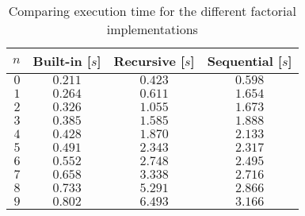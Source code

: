 \begin{table}[ht]
	\begin{center}
	\caption{Comparing execution time for
    the different factorial implementations}
	\label{tab:facT}
		\begin{tabular}{rccc}
		\toprule
			$n$ & Built-in [$s$] & Recursive [$s$] & Sequential [$s$]\\
			\midrule
			$0$ & $0.211$ & $0.423$ & $0.598$\\
			$1$ & $0.264$ & $0.611$ & $1.654$\\
			$2$ & $0.326$ & $1.055$ & $1.673$\\
			$3$ & $0.385$ & $1.585$ & $1.888$\\
			$4$ & $0.428$ & $1.870$ & $2.133$\\
			$5$ & $0.491$ & $2.343$ & $2.317$\\
			$6$ & $0.552$ & $2.748$ & $2.495$\\
			$7$ & $0.658$ & $3.338$ & $2.716$\\
			$8$ & $0.733$ & $5.291$ & $2.866$\\
			$9$ & $0.802$ & $6.493$ & $3.166$\\
		\bottomrule
		\end{tabular}
	\end{center}
\end{table}
